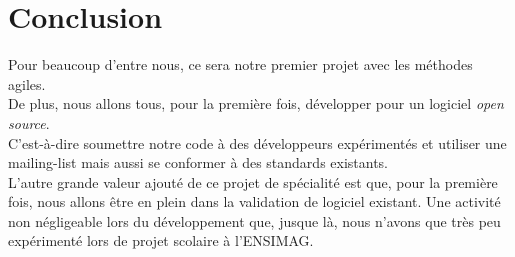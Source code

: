 \documentclass[11pt]{article}
\begin{document}
\section{Conclusion}

Pour beaucoup d'entre nous, ce sera notre premier projet avec les méthodes agiles.\\
De plus, nous allons tous, pour la première fois, développer pour un logiciel \textit{open source}.\\
C'est-à-dire soumettre notre code à des développeurs expérimentés et utiliser une mailing-list mais aussi se conformer à des standards existants.\\
L'autre grande valeur ajouté de ce projet de spécialité est que, pour la première fois, nous allons être en plein dans la validation de logiciel existant. Une activité non négligeable lors du développement que, jusque là, nous n'avons que très peu expérimenté lors de projet scolaire à l'ENSIMAG. 
\end{document}
